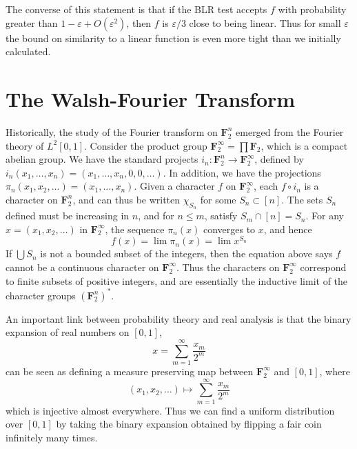 The converse of this statement is that if the BLR test accepts $f$ with probability greater than $1 - \varepsilon + O(\varepsilon^2)$, then $f$ is $\varepsilon/3$ close to being linear. Thus for small $\varepsilon$ the bound on similarity to a linear function is even more tight than we initially calculated.
 
\section{The Walsh-Fourier Transform}

Historically, the study of the Fourier transform on $\mathbf{F}_2^n$ emerged from the Fourier theory of $L^2[0,1]$. Consider the product group $\mathbf{F}_2^\infty = \prod \mathbf{F}_2$, which is a compact abelian group. We have the standard projects $i_n: \mathbf{F}_2^n \to \mathbf{F}_2^\infty$, defined by $i_n(x_1, \dots, x_n) = (x_1, \dots, x_n, 0, 0, \dots)$. In addition, we have the projections $\pi_n(x_1, x_2, \dots) = (x_1, \dots, x_n)$. Given a character $f$ on $\mathbf{F}_2^\infty$, each $f \circ i_n$ is a character on $\mathbf{F}_2^n$, and can thus be written $\chi_{S_n}$ for some $S_n \subset [n]$. The sets $S_n$ defined must be increasing in $n$, and for $n \leq m$, satisfy $S_m \cap [n] = S_n$. For any $x = (x_1, x_2, \dots)$ in $\mathbf{F}_2^\infty$, the sequence $\pi_n(x)$ converges to $x$, and hence
%
\[ f(x) = \lim \pi_n(x) = \lim x^{S_n} \]
%
If $\bigcup S_n$ is not a bounded subset of the integers, then the equation above says $f$ cannot be a continuous character on $\mathbf{F}_2^\infty$. Thus the characters on $\mathbf{F}_2^\infty$ correspond to finite subsets of positive integers, and are essentially the inductive limit of the character groups $(\mathbf{F}_2^n)^*$.

An important link between probability theory and real analysis is that the binary expansion of real numbers on $[0,1]$,
%
\[ x = \sum_{m = 1}^\infty \frac{x_m}{2^m} \]
%
can be seen as defining a measure preserving map between $\mathbf{F}_2^\infty$ and $[0,1]$, where
%
\[ (x_1, x_2, \dots) \mapsto \sum_{m = 1}^\infty \frac{x_m}{2^m} \]
%
which is injective almost everywhere. Thus we can find a uniform distribution over $[0,1]$ by taking the binary expansion obtained by flipping a fair coin infinitely many times.

